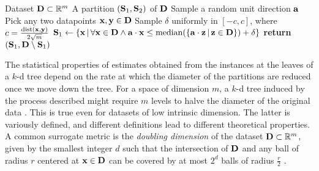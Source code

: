 \begin{algorithm}[t]
  \caption{}\label{alg:splitmax}
  \begin{algorithmic}[1]
    \Require Dataset $\mathbf{D} \subset \mathbb{R}^m$
    \Ensure A partition $(\mathbf{S}_1,\mathbf{S}_2)$ of $\mathbf{D}$
    \State Sample a random unit direction $\mathbf{a}$
    \State Pick any two datapoints $\mathbf{x},\mathbf{y}\in\mathbf{D}$
    \State Sample $\delta$ uniformly in $[-c,c]$, where
    $c=\frac{\operatorname{dist}(\mathbf{x},\mathbf{y})}{2\sqrt{m}}$
    \State $\mathbf{S}_1\gets\{\mathbf{x}\,|\,\forall\mathbf{x}\in\mathbf{D}\wedge\mathbf{a}\cdot\mathbf{x}\leq\operatorname{median}(\{\mathbf{a}\cdot\mathbf{z}\,|\,\mathbf{z}\in\mathbf{D}\})+\delta\}$
    \State \textbf{return} $(\mathbf{S}_1,\mathbf{D}\setminus\mathbf{S}_1)$
  \end{algorithmic}
\end{algorithm}

The statistical properties of estimates obtained from the instances at the leaves of a $k$-d tree
depend on the rate at which the diameter of the partitions are reduced once we move down the tree.
For a space of dimension $m$, a $k$-d tree induced by the process described might require $m$
levels to halve the diameter of the original data \citep{dasgupta08b}. This is true even for
datasets of low intrinsic dimension. The latter is variously defined, and different definitions
lead to different theoretical properties. A common surrogate metric is the \emph{doubling
dimension} of the dataset $\mathbf{D}\subset\mathbb{R}^m$, given by the smallest integer $d$ such that
the intersection of $\mathbf{D}$ and any ball of radius $r$ centered at $\mathbf{x}\in\mathbf{D}$ can be
covered by at most $2^d$ balls of radius $\frac{r}{2}$ \citep{dhesi10}.

